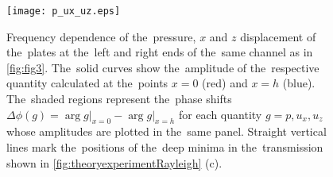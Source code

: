 

%
\begin{figure}
\texttt{[image: p\_ux\_uz.eps]}
\caption{Frequency dependence of the~pressure, $x$ and $z$ displacement of the~plates at the~left and right ends of the~same channel as in \cref{fig:fig3}. The~solid curves show the~amplitude of the~respective quantity calculated at the~points $x=0$ (red) and $x=h$ (blue). The~shaded regions represent the~phase shifts $\Delta\phi(g)=\arg \left.g\right|_{x=0}-\arg \left.g\right|_{x=h}$ for each quantity $g=p,u_x,u_z$ whose amplitudes are plotted in the~same panel. Straight vertical lines mark the~positions of the~deep minima in the~transmission shown in \cref{fig:theoryexperimentRayleigh} (c).}
\label{fig:fig4}
\end{figure}


